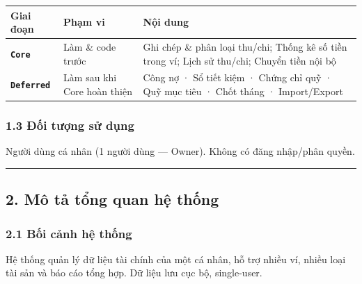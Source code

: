 \documentclass[11pt,a4paper]{article}
\newcounter{none}
\newcommand{\faintline}{%
  \noalign{\global\arrayrulecolor{faintgray}}%
  \hline
  \noalign{\global\arrayrulecolor{black}}%
} %
\begin{document}
{\def\LTcaptype{none}
\begin{longtable}[]{@{}
  >{\raggedright\arraybackslash}p{}
  >{\raggedright\arraybackslash}p{}
  >{\raggedright\arraybackslash}p{}@{}}
\toprule\noalign{}
\begin{minipage}[b]{\linewidth}\raggedright
Giai đoạn
\end{minipage} & \begin{minipage}[b]{\linewidth}\raggedright
Phạm vi
\end{minipage} & \begin{minipage}[b]{\linewidth}\raggedright
Nội dung
\end{minipage} \\
\midrule\noalign{}
\endhead
\bottomrule\noalign{}
\endlastfoot
\textbf{\texttt{Core}} & Làm \& code trước & Ghi chép \& phân loại thu/chi; Thống kê số tiền trong ví; Lịch sử thu/chi; Chuyển tiền nội bộ \\ \faintline
\textbf{\texttt{Deferred}} & Làm sau khi Core hoàn thiện & Công nợ · Sổ tiết kiệm · Chứng chỉ quỹ · Quỹ mục tiêu · Chốt tháng · Import/Export \\
\end{longtable}
}

\subsubsection{1.3 Đối tượng sử dụng}\label{ux111ux1ed1i-tux1b0ux1ee3ng-sux1eed-dux1ee5ng}

Người dùng cá nhân (1 người dùng --- Owner). Không có đăng nhập/phân quyền.

\begin{center}\rule{1.0\linewidth}{0.5pt}\end{center}

\newpage

\subsection{2. Mô tả tổng quan hệ thống}\label{muxf4-tux1ea3-tux1ed5ng-quan-hux1ec7-thux1ed1ng}

\subsubsection{2.1 Bối cảnh hệ thống}\label{bux1ed1i-cux1ea3nh-hux1ec7-thux1ed1ng}

Hệ thống quản lý dữ liệu tài chính của một cá nhân, hỗ trợ nhiều ví,
nhiều loại tài sản và báo cáo tổng hợp. Dữ liệu lưu cục bộ, single-user.
\end{document}
